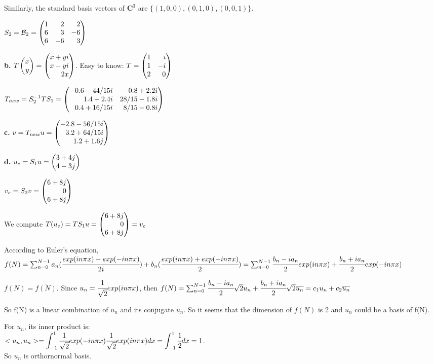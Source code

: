 \documentclass[11pt,a4paper]{article}
\begin{document}
Similarly, the standard basis vectors of $\mathbf{C}^3$ are $\{(1,0,0), (0,1,0), (0,0,1)\}$. 

$S_2=\mathcal{B}_2=\newvec{1&2&2\\6&3&-6\\6&-6&3}$

\textbf{b.} $T\newvec{x\\y}=\newvec{x+yi\\x-yi\\2x}$. Easy to know: $T=\newvec{1&i\\1&-i\\2&0}$

$T_{new}=S_2^{-1}TS_1=\newvec{-0.6-44/15i&-0.8+2.2i\\
1.4+2.4i&28/15-1.8i\\0.4+16/15i&8/15-0.8i}$

\textbf{c.} $v=T_{new}u=\newvec{-2.8-56/15i\\3.2+64/15i\\1.2+1.6j}$

\textbf{d.} $u_e=S_1u=\newvec{3+4j\\4-3j}$

$v_e=S_2v=\newvec{6+8j\\0\\6+8j}$

We compute $T(u_e)=TS_1u=\newvec{6+8j\\0\\6+8j}=v_e$

\newpage 
{}

According to Euler's equation, \\
$f(N)=\sum_{n=0}^{N-1}a_n(\cfrac{exp(in\pi x)-exp(-in\pi x)}{2i})+b_n(\cfrac{exp(in\pi x)+exp(-in\pi x)}{2})\\
=\sum_{n=0}^{N-1}\cfrac{b_n-ia_n}{2}exp(in\pi x)+\cfrac{b_n+ia_n}{2}exp(-in\pi x)$

$f(N)=\overline{f(N)}$. 
Since $u_n=\cfrac{1}{\sqrt{2}}exp(in\pi x)$, then $f(N)=\sum_{n=0}^{N-1}\cfrac{b_n-ia_n}{2}\sqrt{2}u_n+\cfrac{b_n+ia_n}{2}\sqrt{2}\overline{u_n}\\
=c_1u_n+c_2\overline{u_n}$

So f(N) is a linear combination of $u_n$ and its conjugate $\overline{u_n}$. So it seems that the dimension of $f(N)$ is 2 and $u_n$ could be a basis of f(N). 

For $u_n$, its inner product is:\\ 
$<u_n, u_n>=\bint{-1}{1}\cfrac{1}{\sqrt{2}}exp(-in\pi x)\cfrac{1}{\sqrt{2}}exp(in\pi x)dx=\bint{-1}{1}\cfrac{1}{2}dx=1$. \\
So $u_n$ is orthornormal basis. 
\end{document}
